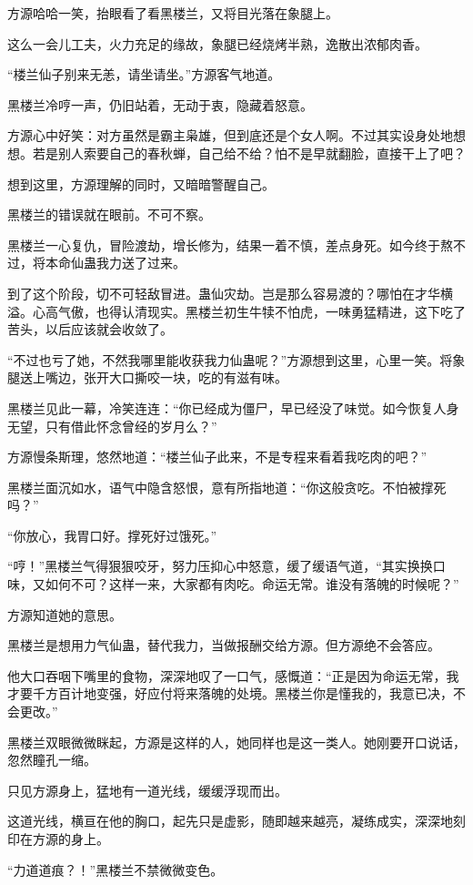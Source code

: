 \begin{this_body}
方源哈哈一笑，抬眼看了看黑楼兰，又将目光落在象腿上。

这么一会儿工夫，火力充足的缘故，象腿已经烧烤半熟，逸散出浓郁肉香。

“楼兰仙子别来无恙，请坐请坐。”方源客气地道。

黑楼兰冷哼一声，仍旧站着，无动于衷，隐藏着怒意。

方源心中好笑：对方虽然是霸主枭雄，但到底还是个女人啊。不过其实设身处地想想。若是别人索要自己的春秋蝉，自己给不给？怕不是早就翻脸，直接干上了吧？

想到这里，方源理解的同时，又暗暗警醒自己。

黑楼兰的错误就在眼前。不可不察。

黑楼兰一心复仇，冒险渡劫，增长修为，结果一着不慎，差点身死。如今终于熬不过，将本命仙蛊我力送了过来。

到了这个阶段，切不可轻敌冒进。蛊仙灾劫。岂是那么容易渡的？哪怕在才华横溢。心高气傲，也得认清现实。黑楼兰初生牛犊不怕虎，一味勇猛精进，这下吃了苦头，以后应该就会收敛了。

“不过也亏了她，不然我哪里能收获我力仙蛊呢？”方源想到这里，心里一笑。将象腿送上嘴边，张开大口撕咬一块，吃的有滋有味。

黑楼兰见此一幕，冷笑连连：“你已经成为僵尸，早已经没了味觉。如今恢复人身无望，只有借此怀念曾经的岁月么？”

方源慢条斯理，悠然地道：“楼兰仙子此来，不是专程来看着我吃肉的吧？”

黑楼兰面沉如水，语气中隐含怒恨，意有所指地道：“你这般贪吃。不怕被撑死吗？”

“你放心，我胃口好。撑死好过饿死。”

“哼！”黑楼兰气得狠狠咬牙，努力压抑心中怒意，缓了缓语气道，“其实换换口味，又如何不可？这样一来，大家都有肉吃。命运无常。谁没有落魄的时候呢？”

方源知道她的意思。

黑楼兰是想用力气仙蛊，替代我力，当做报酬交给方源。但方源绝不会答应。

他大口吞咽下嘴里的食物，深深地叹了一口气，感慨道：“正是因为命运无常，我才要千方百计地变强，好应付将来落魄的处境。黑楼兰你是懂我的，我意已决，不会更改。”

黑楼兰双眼微微眯起，方源是这样的人，她同样也是这一类人。她刚要开口说话，忽然瞳孔一缩。

只见方源身上，猛地有一道光线，缓缓浮现而出。

这道光线，横亘在他的胸口，起先只是虚影，随即越来越亮，凝练成实，深深地刻印在方源的身上。

“力道道痕？！”黑楼兰不禁微微变色。


\end{this_body}
